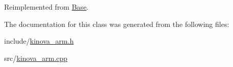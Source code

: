 Reimplemented from \hyperlink{class_base_a5ea313e6980f658e22d14bf3020c1905}{Base}.



The documentation for this class was generated from the following files\+:\begin{DoxyCompactItemize}
\item 
include/\hyperlink{kinova__arm_8h}{kinova\+\_\+arm.\+h}\item 
src/\hyperlink{kinova__arm_8cpp}{kinova\+\_\+arm.\+cpp}\end{DoxyCompactItemize}
